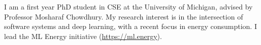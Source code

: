 

\begin{cvparagraph}

I am a first year PhD student in CSE at the University of Michigan, advised by Professor Mosharaf Chowdhury.
My research interest is in the intersection of software systems and deep learning, with a recent focus in energy consumption.
I lead the ML Energy initiative (\url{https://ml.energy}).
\end{cvparagraph}
